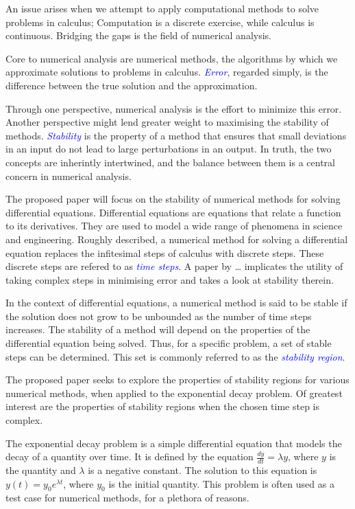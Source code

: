 \documentclass[a4paper, fleqn]{article}
\newcommand{\term}[1]{\textcolor{blue}{\textit{#1}}} %
\begin{document}
\par An issue arises when we attempt to apply computational methods to solve problems in calculus;
Computation is a discrete exercise, while calculus is continuous.
Bridging the gaps is the field of numerical analysis.

\par Core to numerical analysis are numerical methods, the algorithms by which we approximate solutions to problems in calculus.
\term{Error}, regarded simply, is the difference between the true solution and the approximation.

Through one perspective, numerical analysis is the effort to minimize this error.
Another perspective might lend greater weight to maximising the stability of methods.
\term{Stability} is the property of a method that ensures that small deviations in an input do not lead to large perturbations in an output.
In truth, the two concepts are inherintly intertwined, and the balance between them is a central concern in numerical analysis.

The proposed paper will focus on the stability of numerical methods for solving differential equations.
Differential equations are equations that relate a function to its derivatives.
They are used to model a wide range of phenomena in science and engineering.
Roughly described, a numerical method for solving a differential equation replaces the infitesimal steps of calculus with discrete steps.
These discrete steps are refered to as \term{time steps}.
A paper by \ldots \cite{walking_into_the_complex_domain} implicates the utility of taking complex steps in minimising error and takes a look at stability therein.

In the context of differential equations, a numerical method is said to be stable if the solution does not grow to be unbounded as the number of time steps increases.
The stability of a method will depend on the properties of the differential equation being solved.
Thus, for a specific problem, a set of stable steps can be determined.
This set is commonly referred to as the \term{stability region}.

The proposed paper seeks to explore the properties of stability regions for various numerical methods, when applied to the exponential decay problem.
Of greatest interest are the properties of stability regions when the chosen time step is complex.

The exponential decay problem is a simple differential equation that models the decay of a quantity over time.
It is defined by the equation $\frac{dy}{dt} = \lambda y$, where $y$ is the quantity and $\lambda$ is a negative constant.
The solution to this equation is $y(t) = y_0 e^{\lambda t}$, where $y_0$ is the initial quantity.
This problem is often used as a test case for numerical methods, for a plethora of reasons.
\end{document}

